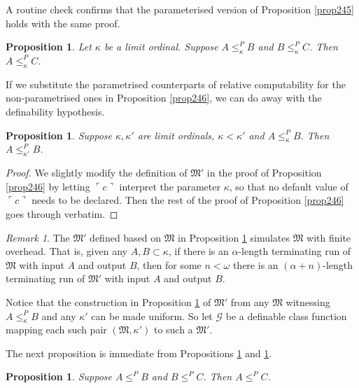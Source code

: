 \documentclass[12pt, twoside]{memoir}
\numberwithin{equation}{section}
\newtheorem{prop}[thm]{Proposition}
\theoremstyle{definition}
\theoremstyle{remark}
\newtheorem{rem}[thm]{Remark}
\theoremstyle{definition}
\theoremstyle{definition}
\theoremstyle{definition}
\theoremstyle{remark}
\begin{document}
A routine check confirms that the parameterised version of Proposition \ref{prop245} holds with the same proof.

\begin{prop}\label{prop251}
Let $\kappa$ be a limit ordinal. Suppose $A \leq^P_{\kappa} B$ and $B \leq^P_{\kappa} C$. Then $A \leq^P_{\kappa} C$.
\end{prop}

If we substitute the parametrised counterparts of relative computability for the non-parametrised ones in Proposition \ref{prop246}, we can do away with the definability hypothesis.

\begin{prop}\label{prop252}
Suppose $\kappa, \kappa'$ are limit ordinals, $\kappa < \kappa'$ and $A \leq^P_{\kappa} B$. Then $A \leq^P_{\kappa'} B$.
\end{prop}

\begin{proof}
We slightly modify the definition of $\mathfrak{M}'$ in the proof of Proposition \ref{prop246} by letting $\ulcorner c \urcorner$ interpret the parameter $\kappa$, so that no default value of $\ulcorner c \urcorner$ needs to be declared. Then the rest of the proof of Proposition \ref{prop246} goes through verbatim.
\end{proof}

\begin{rem}\label{rem256}
The $\mathfrak{M}'$ defined based on $\mathfrak{M}$ in Proposition \ref{prop252} simulates $\mathfrak{M}$ with finite overhead. That is, given any $A, B \subset \kappa$, if there is an $\alpha$-length terminating run of $\mathfrak{M}$ with input $A$ and output $B$, then for some $n < \omega$ there is an $(\alpha + n)$-length terminating run of $\mathfrak{M}'$ with input $A$ and output $B$.
\end{rem}

Notice that the construction in Proposition \ref{prop252} of $\mathfrak{M}'$ from any $\mathfrak{M}$ witnessing $A \leq^P_{\kappa} B$ and any $\kappa'$ can be made uniform. So let $\mathcal{G}$ be a definable class function mapping each such pair $(\mathfrak{M}, \kappa')$ to such a $\mathfrak{M}'$.

The next proposition is immediate from Propositions \ref{prop251} and \ref{prop252}.

\begin{prop}
Suppose $A \leq^P B$ and $B \leq^P C$. Then $A \leq^P C$.
\end{prop} 
\end{document}
